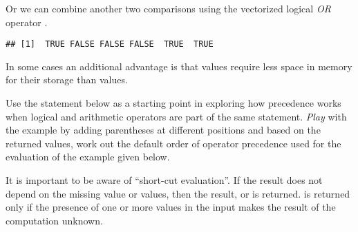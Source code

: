 \documentclass[krantz2]{krantz}\usepackage{knitr}
\begin{document}
Or we can combine another two comparisons using the vectorized logical \emph{OR} operator \Roperator{\textbar}.

\begin{knitrout}\footnotesize
{}\color{fgcolor}\begin{kframe}
\begin{alltt}
 \hlkwb{<-} \hlopt{-}\hlopt{:}
 \hlopt{< -} \hlopt{|}  \hlopt{>} 
\end{alltt}
\begin{verbatim}
## [1]  TRUE FALSE FALSE FALSE  TRUE  TRUE
\end{verbatim}
\end{kframe}
\end{knitrout}

In some cases an additional advantage is that  values require less space in memory for their storage than  values.

\begin{playground}
Use the statement below as a starting point in exploring how precedence works when logical and arithmetic operators are part of the same statement. \emph{Play} with the example by adding parentheses at different positions and based on the returned values, work out the default order of operator precedence used for the evaluation of the example given below.

\begin{knitrout}\footnotesize
{}\color{fgcolor}\begin{kframe}
\begin{alltt}
 \hlkwb{<-} \hlopt{:}
 \hlopt{>}  \hlopt{|}  \hlopt{+}  \hlopt{<} 
\end{alltt}
\end{kframe}
\end{knitrout}
\end{playground}

It is important to be aware of ``short-cut evaluation''. If the result does not depend on the missing value or values, then the result,  or  is returned.  is returned only if the presence of one or more  values in the input makes the result of the computation unknown.
\end{document}
